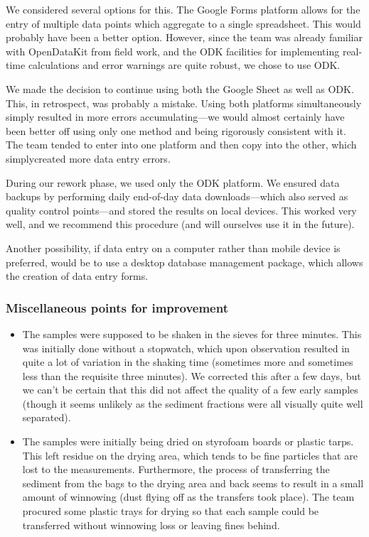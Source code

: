 \documentclass[a4paper,12pt]{article}
\begin{document}
We considered several options for this. The Google Forms platform allows for the entry of multiple data points which aggregate to a single spreadsheet. This would probably have been a better option. However, since the team was already familiar with OpenDataKit from field work, and the ODK facilities for implementing real-time calculations and error warnings are quite robust, we chose to use ODK.

We made the decision to continue using both the Google Sheet as well as ODK. This, in retrospect, was probably a mistake. Using both platforms simultaneously simply resulted in more errors accumulating---we would almost certainly have been better off using only one method and being rigorously consistent with it. The team tended to enter into one platform and then copy into the other, which simplycreated more data entry errors.

During our rework phase, we used only the ODK platform. We ensured data backups by performing daily end-of-day data downloads---which also served as quality control points---and stored the results on local devices. This worked very well, and we recommend this procedure (and will ourselves use it in the future).

Another possibility, if data entry on a computer rather than mobile device is preferred, would be to use a desktop database management package, which allows the creation of data entry forms.

\subsubsection{Miscellaneous points for improvement}
\begin{itemize}
  \item The samples were supposed to be shaken in the sieves for three minutes. This was initially done without a stopwatch, which upon observation resulted in quite a lot of variation in the shaking time (sometimes more and sometimes less than the requisite three minutes). We corrected this after a few days, but we can't be certain that this did not affect the quality of a few early samples (though it seems unlikely as the sediment fractions were all visually quite well separated).
  \item The samples were initially being dried on styrofoam boards or plastic tarps. This left residue on the drying area, which tends to be fine particles that are lost to the measurements. Furthermore, the process of transferring the sediment from the bags to the drying area and back seems to result in a small amount of winnowing (dust flying off as the transfers took place). The team procured some plastic trays for drying so that each sample could be transferred without winnowing loss or leaving fines behind.
\end{itemize}
\end{document}

